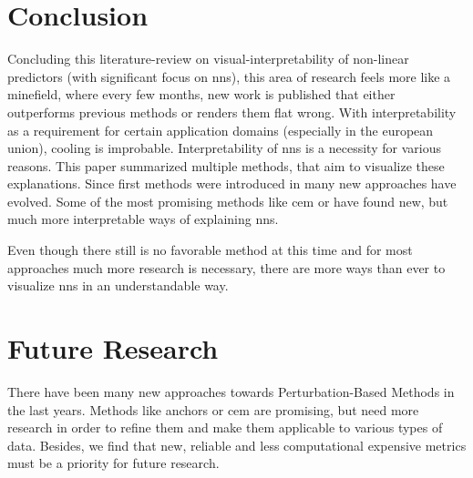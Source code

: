 \section{Conclusion}
Concluding this literature-review on visual-interpretability of non-linear predictors (with significant focus on \glspl{nn}), this area of research feels more like a minefield, where every few months, new work is published that either outperforms previous methods or renders them flat wrong. With interpretability as a requirement for certain application domains (especially in the european union), cooling is improbable. Interpretability of \glspl{nn} is a necessity for various reasons. This paper summarized multiple methods, that aim to visualize these explanations. Since first methods were introduced in \cite{RobnikSikonja.2008} many new approaches have evolved. Some of the most promising methods like \gls{cem} or  have found new, but much more interpretable ways of explaining \glspl{nn}. 
\par
Even though there still is no favorable method at this time and for most approaches much more research is necessary, there are more ways than ever to visualize \glspl{nn} in an understandable way.

\section{Future Research}
There have been many new approaches towards Perturbation-Based Methods in the last years. Methods like anchors or \gls{cem} are promising, but need more research in order to refine them and make them applicable to various types of data. Besides, we find that new, reliable and less computational expensive metrics must be a priority for future research.
